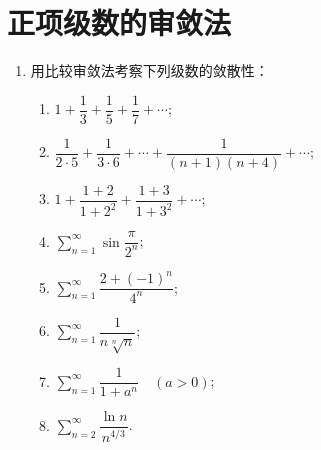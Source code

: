 \section{正项级数的审敛法}

\begin{enumerate}\setlength{\itemsep}{7pt}
    \item 用比较审敛法考察下列级数的敛散性：
    \begin{enumerate}[(1)]\setlength{\itemsep}{10pt}
        \item $1+\dfrac{1}{3}+\dfrac{1}{5}+\dfrac{1}{7}+\cdots$;
        \item $\dfrac{1}{2\cdot5}+\dfrac{1}{3\cdot6}+\cdots+\dfrac{1}{(n+1)(n+4)}+\cdots$;
        \item $1+\dfrac{1+2}{1+2^2}+\dfrac{1+3}{1+3^2}+\cdots$;
        \item $\displaystyle\sum_{n=1}^{\infty}\sin\dfrac{\pi}{2^n}$;
        \item $\displaystyle\sum_{n=1}^{\infty}\dfrac{2+(-1)^n}{4^n}$;
        \item $\displaystyle\sum_{n=1}^{\infty}\dfrac{1}{n\sqrt[n]{n}}$;
        \item $\displaystyle\sum_{n=1}^{\infty}\dfrac{1}{1+a^n}\quad(a>0)$;
        \item $\displaystyle\sum_{n=2}^{\infty}\dfrac{\ln n}{n^{4/3}}$.
    \end{enumerate}


\end{enumerate}
